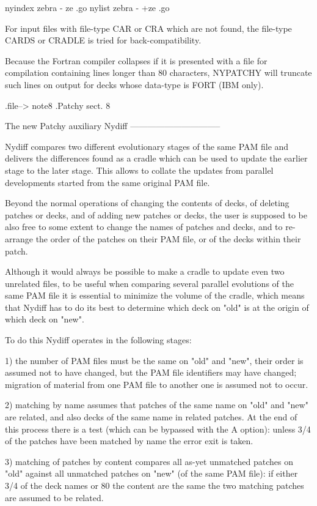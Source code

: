       nyindex  zebra -  ze  .go
      nylist   zebra - +ze  .go


For input files with file-type CAR or CRA which are not found,
the file-type CARDS or CRADLE is tried for back-compatibility.


Because the Fortran compiler collapses if it is presented with
a file for compilation containing lines longer than 80 characters,
NYPATCHY will truncate such lines on output for decks whose
data-type is FORT (IBM only).


.file-->  note8
.Patchy sect. 8


               The new Patchy auxiliary Nydiff
               --------------------------------

Nydiff compares two different evolutionary stages of the same
PAM file and delivers the differences found as a cradle which
can be used to update the earlier stage to the later stage.
This allows to collate the updates from parallel developments
started from the same original PAM file.

Beyond the normal operations of changing the contents of decks,
of deleting patches or decks, and of adding new patches or decks,
the user is supposed to be also free to some extent to change
the names of patches and decks, and to re-arrange the order of
the patches on their PAM file, or of the decks within their patch.

Although it would always be possible to make a cradle to update
even two unrelated files, to be useful when comparing several
parallel evolutions of the same PAM file it is essential to
minimize the volume of the cradle, which means that Nydiff has
to do its best to determine which deck on "old" is at the origin
of which deck on "new".

To do this Nydiff operates in the following stages:

 1) the number of PAM files must be the same on "old" and "new",
    their order is assumed not to have changed, but the PAM file
    identifiers may have changed; migration of material from one
    PAM file to another one is assumed not to occur.

 2) matching by name assumes that patches of the same name on
    "old" and "new" are related, and also decks of the same name
    in related patches. At the end of this process there is a
    test (which can be bypassed with the A option): unless
    3/4 of the patches have been matched by name the error exit
    is taken.

 3) matching of patches by content compares all as-yet unmatched
    patches on "old" against all unmatched patches on "new" (of
    the same PAM file): if either 3/4 of the deck names or 80%
    the content are the same the two matching patches are assumed
    to be related.

